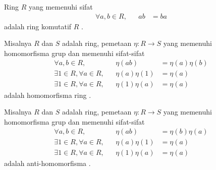 \begin{defn}
Ring $R$ yang memenuhi sifat
\begin{align*}
    \forall a,b \in R,&& ab &= ba
\end{align*}
adalah ring komutatif $R$ \citep{Jacobson1995}.
\end{defn}

\begin{defn}
Misalnya $R$ dan $S$ adalah ring, pemetaan ${\eta: R \to S}$ yang memenuhi homomorfisma grup dan memenuhi sifat-sifat
\begingroup
\allowdisplaybreaks
\begin{align*}
    \forall a,b \in R,&& \eta(ab) &= \eta(a)\eta(b) \\
    \exists 1 \in R, \forall a \in R,&& \eta(a)\eta(1) &= \eta(a) \\
    \exists 1 \in R, \forall a \in R,&& \eta(1)\eta(a) &= \eta(a)
\end{align*}
\endgroup
adalah homomorfisma ring \citep{Jacobson1995}.
\end{defn}

\begin{defn}
Misalnya $R$ dan $S$ adalah ring, pemetaan ${\eta: R \to S}$ yang memenuhi homomorfisma grup dan memenuhi sifat-sifat
\begingroup
\allowdisplaybreaks
\begin{align*}
    \forall a,b \in R,&& \eta(ab) &= \eta(b)\eta(a) \\
    \exists 1 \in R, \forall a \in R,&& \eta(a)\eta(1) &= \eta(a) \\
    \exists 1 \in R, \forall a \in R,&& \eta(1)\eta(a) &= \eta(a)
\end{align*}
\endgroup
adalah anti-homomorfisma \citep{Jacobson1995}.
\end{defn}

